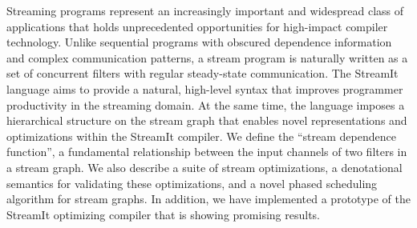 Streaming programs represent an increasingly important and widespread
class of applications that holds unprecedented opportunities for
high-impact compiler technology.  Unlike sequential programs with
obscured dependence information and complex communication patterns, a
stream program is naturally written as a set of concurrent filters
with regular steady-state communication.  The StreamIt language aims
to provide a natural, high-level syntax that improves programmer
productivity in the streaming domain.  At the same time, the language
imposes a hierarchical structure on the stream graph that enables
novel representations and optimizations within the StreamIt compiler.
We define the ``stream dependence function'', a fundamental
relationship between the input channels of two filters in a stream
graph.  We also describe a suite of stream optimizations, a
denotational semantics for validating these optimizations, and a novel
phased scheduling algorithm for stream graphs.  In addition, we have
implemented a prototype of the StreamIt optimizing compiler that is
showing promising results.
